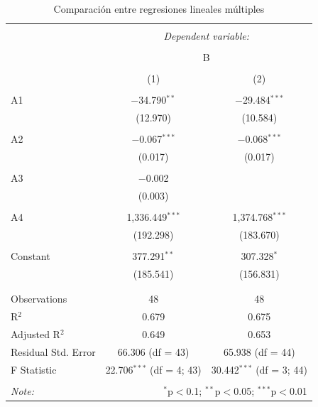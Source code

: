 \documentclass[a4paper,10pt]{article}\usepackage[]{graphicx}\usepackage[]{color}
\begin{document}
\begin{table}[!htbp] \centering 
  \caption{Comparación entre regresiones lineales múltiples} 
  \label{} 
\begin{tabular}{@{\extracolsep{5pt}}lcc} 
\\[-1.8ex]\hline 
\hline \\[-1.8ex] 
 & \multicolumn{2}{c}{\textit{Dependent variable:}} \\ 
\cline{2-3} 
\\[-1.8ex] & \multicolumn{2}{c}{B} \\ 
\\[-1.8ex] & (1) & (2)\\ 
\hline \\[-1.8ex] 
 A1 & $-$34.790$^{**}$ & $-$29.484$^{***}$ \\ 
  & (12.970) & (10.584) \\ 
  & & \\ 
 A2 & $-$0.067$^{***}$ & $-$0.068$^{***}$ \\ 
  & (0.017) & (0.017) \\ 
  & & \\ 
 A3 & $-$0.002 &  \\ 
  & (0.003) &  \\ 
  & & \\ 
 A4 & 1,336.449$^{***}$ & 1,374.768$^{***}$ \\ 
  & (192.298) & (183.670) \\ 
  & & \\ 
 Constant & 377.291$^{**}$ & 307.328$^{*}$ \\ 
  & (185.541) & (156.831) \\ 
  & & \\ 
\hline \\[-1.8ex] 
Observations & 48 & 48 \\ 
R$^{2}$ & 0.679 & 0.675 \\ 
Adjusted R$^{2}$ & 0.649 & 0.653 \\ 
Residual Std. Error & 66.306 (df = 43) & 65.938 (df = 44) \\ 
F Statistic & 22.706$^{***}$ (df = 4; 43) & 30.442$^{***}$ (df = 3; 44) \\ 
\hline 
\hline \\[-1.8ex] 
\textit{Note:}  & \multicolumn{2}{r}{$^{*}$p$<$0.1; $^{**}$p$<$0.05; $^{***}$p$<$0.01} \\ 
\end{tabular} 
\end{table} 
\end{document}
